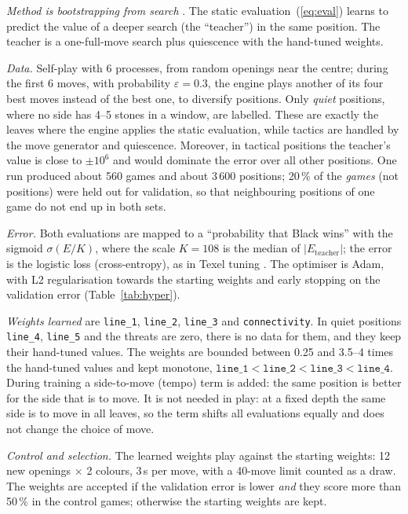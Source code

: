 \documentclass[a4paper,10pt,twocolumn]{article}
\newcommand{\code}[1]{\texttt{#1}}
\begin{document}
\emph{Method is bootstrapping from search} \citep{veness2009bootstrapping,texel}. The static evaluation~(\ref{eq:eval}) learns to predict the value of a deeper search (the ``teacher'') in the same position. The teacher is a one-full-move search plus quiescence with the hand-tuned weights.

\emph{Data.} Self-play with 6 processes, from random openings near the centre; during the first 6 moves, with probability $\varepsilon=0.3$, the engine plays another of its four best moves instead of the best one, to diversify positions. Only \emph{quiet} positions, where no side has 4--5 stones in a window, are labelled. These are exactly the leaves where the engine applies the static evaluation, while tactics are handled by the move generator and quiescence. Moreover, in tactical positions the teacher's value is close to $\pm10^6$ and would dominate the error over all other positions. One run produced about 560 games and about 3\,600 positions; 20\,\% of the \emph{games} (not positions) were held out for validation, so that neighbouring positions of one game do not end up in both sets.

\emph{Error.} Both evaluations are mapped to a ``probability that Black wins'' with the sigmoid $\sigma(E/K)$, where the scale $K=108$ is the median of $|E_{\text{teacher}}|$; the error is the logistic loss (cross-entropy), as in Texel tuning \citep{texel}. The optimiser is Adam, with L2 regularisation towards the starting weights and early stopping on the validation error (Table~\ref{tab:hyper}).

\emph{Weights learned} are \code{line\_1}, \code{line\_2}, \code{line\_3} and \code{connectivity}. In quiet positions \code{line\_4}, \code{line\_5} and the threats are zero, there is no data for them, and they keep their hand-tuned values. The weights are bounded between 0.25 and 3.5--4 times the hand-tuned values and kept monotone, $\code{line\_1}<\code{line\_2}<\code{line\_3}<\code{line\_4}$. During training a side-to-move (tempo) term is added: the same position is better for the side that is to move. It is not needed in play: at a fixed depth the same side is to move in all leaves, so the term shifts all evaluations equally and does not change the choice of move.

\emph{Control and selection.} The learned weights play against the starting weights: 12 new openings $\times$ 2 colours, 3\,s per move, with a 40-move limit counted as a draw. The weights are accepted if the validation error is lower \emph{and} they score more than 50\,\% in the control games; otherwise the starting weights are kept.
\end{document}
